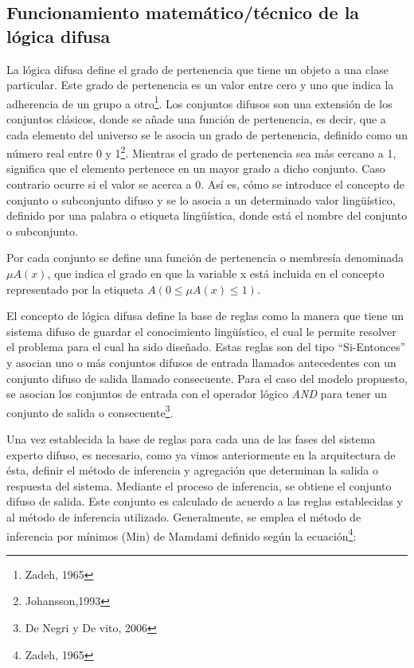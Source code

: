 \documentclass[a4paper, 11pt, titlepage]{article}
\begin{document}
    \subsection{Funcionamiento matemático/técnico de la lógica difusa}

        La lógica difusa define el grado de pertenencia que tiene un 
        objeto a una clase particular. Este grado de pertenencia es un valor entre cero y uno que 
        indica la adherencia de un grupo a otro\footnote{
            Zadeh, 1965
        }. Los conjuntos difusos son una extensión 
        de los conjuntos clásicos, donde se añade una función de pertenencia, es decir, que a cada 
        elemento del universo se le asocia un grado de pertenencia, definido como un número real entre 
        0 y 1\footnote{
            Johansson,1993
        }. Mientras el grado de pertenencia sea más cercano a 1, significa que el 
        elemento pertenece en un mayor grado a dicho conjunto. Caso contrario ocurre si el valor se 
        acerca a 0. Así es, cómo se introduce el concepto de conjunto o subconjunto difuso y se lo 
        asocia a un determinado valor lingüístico, definido por una palabra o etiqueta lingüística, 
        donde está el nombre del conjunto o subconjunto. 
        
        Por cada conjunto se define una función de 
        pertenencia o membresía denominada $\mu A(x)$, que indica el grado en que la variable x está incluida 
        en el concepto representado por la etiqueta $A (0 \leq \mu A(x) \leq 1)$. 

        El concepto de lógica difusa define la base de reglas como la manera que tiene un sistema difuso 
        de guardar el conocimiento lingüístico, el cual le permite resolver el problema para el cual ha 
        sido diseñado. Estas reglas son del tipo “Si-Entonces” y asocian uno o más conjuntos difusos de 
        entrada llamados antecedentes con un conjunto difuso de salida llamado consecuente. Para el caso 
        del modelo propuesto, se asocian los conjuntos de entrada con el operador lógico \textit{AND} para tener 
        un conjunto de salida o consecuente\footnote{
            De Negri y De vito, 2006
        }.

        Una vez establecida la base de reglas para cada una de las fases del sistema experto difuso, 
        es necesario, como ya vimos anteriormente en la arquitectura de ésta, definir el método de 
        inferencia y agregación que determinan la salida o respuesta del sistema. Mediante el proceso de 
        inferencia, se obtiene el conjunto difuso de salida. Este conjunto es calculado de acuerdo a las
        reglas establecidas y al método de inferencia utilizado. Generalmente, se emplea el método de 
        inferencia por mínimos (Min) de Mamdami definido según la ecuación\footnote{
            Zadeh, 1965
        }:
\end{document}
